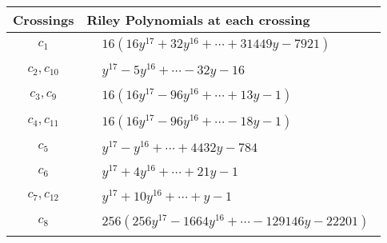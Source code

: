 \documentclass[1p]{elsarticle_modified}
\theoremstyle{definition}
\begin{document}
\begin{tabular}{m{50pt}|m{274pt}}
Crossings & \hspace{64pt}Riley Polynomials at each crossing \\
\hline $$\begin{aligned}c_{1}\end{aligned}$$&$\begin{aligned}
&16(16 y^{17}+32 y^{16}+\cdots+31449 y-7921)
\end{aligned}$\\
\hline $$\begin{aligned}c_{2},c_{10}\end{aligned}$$&$\begin{aligned}
&y^{17}-5 y^{16}+\cdots-32 y-16
\end{aligned}$\\
\hline $$\begin{aligned}c_{3},c_{9}\end{aligned}$$&$\begin{aligned}
&16(16 y^{17}-96 y^{16}+\cdots+13 y-1)
\end{aligned}$\\
\hline $$\begin{aligned}c_{4},c_{11}\end{aligned}$$&$\begin{aligned}
&16(16 y^{17}-96 y^{16}+\cdots-18 y-1)
\end{aligned}$\\
\hline $$\begin{aligned}c_{5}\end{aligned}$$&$\begin{aligned}
&y^{17}- y^{16}+\cdots+4432 y-784
\end{aligned}$\\
\hline $$\begin{aligned}c_{6}\end{aligned}$$&$\begin{aligned}
&y^{17}+4 y^{16}+\cdots+21 y-1
\end{aligned}$\\
\hline $$\begin{aligned}c_{7},c_{12}\end{aligned}$$&$\begin{aligned}
&y^{17}+10 y^{16}+\cdots+y-1
\end{aligned}$\\
\hline $$\begin{aligned}c_{8}\end{aligned}$$&$\begin{aligned}
&256(256 y^{17}-1664 y^{16}+\cdots-129146 y-22201)
\end{aligned}$\\
\hline
\end{tabular}\\~\\
\end{document}
